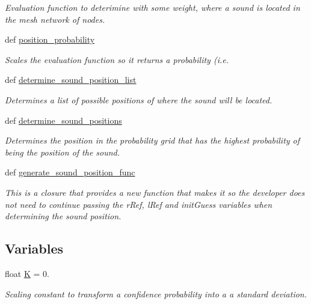 \begin{DoxyCompactItemize}
\begin{DoxyCompactList}\small\item\em Evaluation function to deterimine with some weight, where a sound is located in the mesh network of nodes. \end{DoxyCompactList}\item 
def \hyperlink{namespacelocaudio_1_1triangulation_ab85ddfec0f2c6c1c20134d90a6fe874a}{position\-\_\-probability}
\begin{DoxyCompactList}\small\item\em Scales the evaluation function so it returns a probability (i.\-e. \end{DoxyCompactList}\item 
def \hyperlink{namespacelocaudio_1_1triangulation_ad01abd5ed08c05988dea7978b141549c}{determine\-\_\-sound\-\_\-position\-\_\-list}
\begin{DoxyCompactList}\small\item\em Determines a list of possible positions of where the sound will be located. \end{DoxyCompactList}\item 
def \hyperlink{namespacelocaudio_1_1triangulation_a37420560e73cb3aefbdff181774725be}{determine\-\_\-sound\-\_\-positions}
\begin{DoxyCompactList}\small\item\em Determines the position in the probability grid that has the highest probability of being the position of the sound. \end{DoxyCompactList}\item 
def \hyperlink{namespacelocaudio_1_1triangulation_a91ab07f598b1161238e199e127fef855}{generate\-\_\-sound\-\_\-position\-\_\-func}
\begin{DoxyCompactList}\small\item\em This is a closure that provides a new function that makes it so the developer does not need to continue passing the r\-Ref, l\-Ref and init\-Guess variables when determining the sound position. \end{DoxyCompactList}\end{DoxyCompactItemize}
\subsection*{Variables}
\begin{DoxyCompactItemize}
\item 
float \hyperlink{namespacelocaudio_1_1triangulation_ac85bcbed961d15baa586ddc0192860bb}{K} = 0.
\begin{DoxyCompactList}\small\item\em Scaling constant to transform a confidence probability into a a standard deviation. \end{DoxyCompactList}\end{DoxyCompactItemize}


